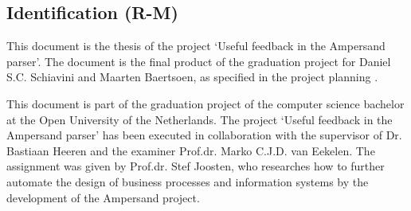 
\subsection{Identification (R-M)}
This document is the thesis of the project `Useful feedback in the Ampersand parser'.
The document is the final product of the graduation project for Daniel S.C. Schiavini and Maarten Baertsoen, as specified in the project planning .

This document is part of the graduation project of the computer science bachelor at the Open University of the Netherlands.
The project `Useful feedback in the Ampersand parser' has been executed in collaboration with the supervisor of Dr. Bastiaan Heeren and the examiner Prof.dr. Marko C.J.D. van Eekelen.
The assignment was given by Prof.dr. Stef Joosten, who researches how to further automate the design of business processes and information systems by the development of the Ampersand project.
